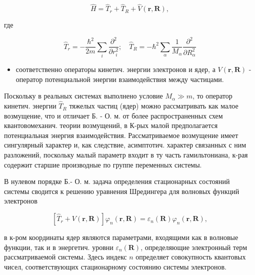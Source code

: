 \documentclass[10pt]{article}
\begin{document}
\[

\hat{H}=\hat{T}_{r}+\hat{T}_{R}+\hat{V}(\boldsymbol{r}, \boldsymbol{R}),

\]



где



\[

\hat{T}_{r}=-\frac{\hbar^{2}}{2 m} \sum_{i} \frac{\partial^{2}}{\partial r_{i}^{2}} ; \quad \hat{T}_{R}=-\hbar^{2} \sum_{\alpha} \frac{1}{M_{\alpha}} \frac{\partial^{2}}{\partial R_{\alpha}^{2}}

\]



\begin{itemize}

  \item соответственно операторы кинетич. энергии электронов и ядер, а $V(\boldsymbol{r}, \boldsymbol{R})$ - оператор потенциальной энергии взаимодействия между частицами.

\end{itemize}



Поскольку в реальных системах выполнено условие $M_{\alpha} \gg m$, то оператор кинетич. энергии $\hat{T}_{R}$ тяжелых частиц (ядер) можно рассматривать как малое возмущение, что и отличает Б. - О. м. от более распространенных схем квантовомеханич. теории возмущений, в К-рых малой предполагается потенциальная энергия взаимодействия. Рассматриваемое возмущение имеет сингулярный характер и, как следствие, асимптотич. характер связанных с ним разложений, поскольку малый параметр входит в ту часть гамильтониана, к-рая содержит старшие производные по группе переменных системы.



В нулевом порядке Б.- О. м. задача определения стационарных состояний системы сводится к решению уравнения Шредингера для волновых функций электронов



\[

\left[\hat{T}_{r}+V(\boldsymbol{r}, \boldsymbol{R})\right] \varphi_{n}(\boldsymbol{r}, \boldsymbol{R})=\varepsilon_{n}(\boldsymbol{R}) \varphi_{n}(\boldsymbol{r}, \boldsymbol{R}),

\]



в к-ром координаты ядер являются параметрами, входящими как в волновые функции, так и в энергетич. уровни $\varepsilon_{n}(\boldsymbol{R})$, определяющие электронный терм рассматриваемой системы. Здесь индекс $n$ определяет совокупность квантовых чисел, соответствующих стационарному состоянию системы электронов.
\end{document}
